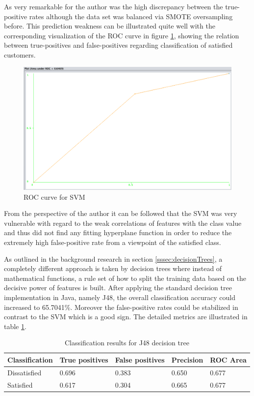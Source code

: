 As very remarkable for the author was the high discrepancy between the true-positive rates although the data set was balanced via SMOTE oversampling before. This prediction weakness can be illustrated quite well with the corresponding visualization of the ROC curve in figure \ref{fig:rocCurveSVM}, showing the relation between true-positives and false-positives regarding classification of satisfied customers. 

\begin{figure}
	\centering
	\includegraphics[width=1.0\textwidth]{img/rocResultSVM.png}
	\caption{ROC curve for SVM}
	\label{fig:rocCurveSVM}
\end{figure}

From the perspective of the author it can be followed that the SVM was very vulnerable with regard to the weak correlations of features with the class value and thus did not find any fitting hyperplane function in order to reduce the extremely high false-positive rate from a viewpoint of the satisfied class. 

As outlined in the background research in section \ref{sssec:decisionTrees}, a completely different approach is taken by decision trees where instead of mathematical functions, a rule set of how to split the training data based on the decisive power of features is built. After applying the standard decision tree implementation in Java, namely J48, the overall classification accuracy could increased to 65.7041\%. Moreover the false-positive rates could be stabilized in contrast to the SVM which is a good sign. The detailed metrics are illustrated in table \ref{tab:decisionTreeResult}. 

\begin{table}[]
	\centering
	\begin{tabular}{|l|l|l|l|l|}
		\hline
		\textbf{Classification} & \textbf{True positives} & \textbf{False positives} & \textbf{Precision} & \textbf{ROC Area} \\ \hline
		Dissatisfied            & 0.696                 & 0.383                    & 0.650              & 0.677             \\ \hline
		Satisfied               & 0.617                   & 0.304                    & 0.665                & 0.677             \\ \hline
	\end{tabular}
	\caption{Classification results for J48 decision tree}
	\label{tab:decisionTreeResult}
\end{table}

